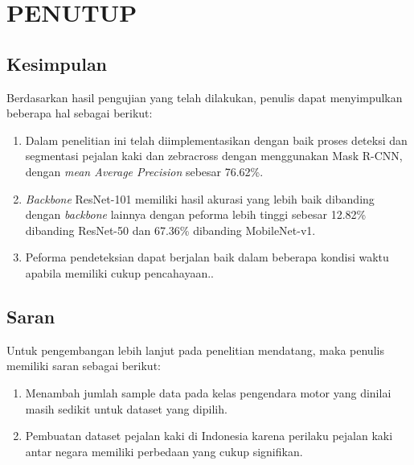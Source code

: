\chapter{PENUTUP}
\label{chap:penutup}


\section{Kesimpulan}
\label{sec:kesimpulan}

Berdasarkan hasil pengujian yang telah dilakukan, penulis dapat menyimpulkan beberapa hal sebagai berikut:

\begin{enumerate}[nolistsep]

  \item Dalam penelitian ini telah diimplementasikan dengan baik proses deteksi dan segmentasi pejalan kaki dan zebracross dengan menggunakan Mask R-CNN, dengan \textit{mean Average Precision} sebesar 76.62\%.
  \item \textit{Backbone} ResNet-101 memiliki hasil akurasi yang lebih baik dibanding dengan \textit{backbone} lainnya dengan peforma lebih tinggi sebesar 12.82\% dibanding ResNet-50 dan 67.36\% dibanding MobileNet-v1. 
  \item Peforma pendeteksian dapat berjalan baik dalam beberapa kondisi waktu apabila memiliki cukup pencahayaan..
  
\end{enumerate}

\section{Saran}
\label{sec:saran}

Untuk pengembangan lebih lanjut pada penelitian mendatang, maka penulis memiliki saran sebagai berikut:

\begin{enumerate}[nolistsep]

  \item Menambah jumlah sample data pada kelas pengendara motor yang dinilai masih sedikit untuk dataset yang dipilih.

  \item Pembuatan dataset pejalan kaki di Indonesia karena perilaku pejalan kaki antar negara memiliki perbedaan yang cukup signifikan.

\end{enumerate}

